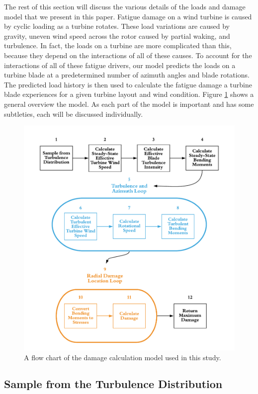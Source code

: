 \documentclass[11pt,letterpaper]{article}
\begin{document}
The rest of this section will discuss the various details of the loads and damage model that we present in this paper. 
Fatigue damage on a wind turbine is caused by cyclic loading as a turbine rotates. These load variations are caused by gravity, uneven wind speed across the rotor caused by partial waking, and turbulence. In fact, the loads on a turbine are more complicated than this, because they depend on the interactions of all of these causes.
To account for the interactions of all of these fatigue drivers, our model predicts the loads on a turbine blade at a predetermined number of azimuth angles and blade rotations. The predicted load history is then used to calculate the fatigue damage a turbine blade experiences for a given turbine layout and wind condition.
Figure \ref{flow-chart} shows a general overview the model. As each part of the model is important and has some subtleties, each will be discussed individually.
% 
\begin{figure}
    \centering
    \includegraphics[]{images/fatigue-model.pdf}
    \caption{A flow chart of the damage calculation model used in this study.}
    \label{flow-chart}
\end{figure}

\subsection{Sample from the Turbulence Distribution}
\end{document}
